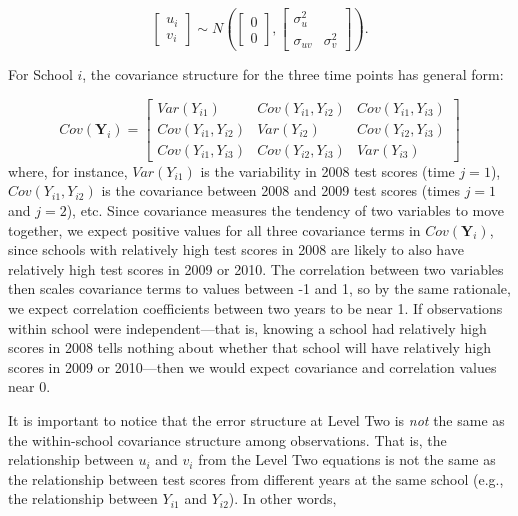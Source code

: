 \documentclass[
]{krantz}
\begin{document}
\[ \left[ \begin{array}{c}
            u_{i} \\ v_{i}
          \end{array}  \right] \sim N \left( \left[
          \begin{array}{c}
            0 \\ 0
          \end{array} \right], \left[
          \begin{array}{cc}
            \sigma_{u}^{2} & \\
            \sigma_{uv} & \sigma_{v}^{2}
          \end{array} \right] \right) . \]

For School \(i\), the covariance structure for the three time points has general form:

\[ Cov(\mathbf{Y}_i) =  \left[
          \begin{array}{cccc}
            Var(Y_{i1}) & Cov(Y_{i1},Y_{i2}) & Cov(Y_{i1},Y_{i3}) \\
            Cov(Y_{i1},Y_{i2}) & Var(Y_{i2}) & Cov(Y_{i2},Y_{i3}) \\
            Cov(Y_{i1},Y_{i3}) & Cov(Y_{i2},Y_{i3}) & Var(Y_{i3})
          \end{array} \right] \]
where, for instance, \(Var(Y_{i1})\) is the variability in 2008 test scores (time \(j=1\)), \(Cov(Y_{i1},Y_{i2})\) is the covariance between 2008 and 2009 test scores (times \(j=1\) and \(j=2\)), etc. Since covariance measures the tendency of two variables to move together, we expect positive values for all three covariance terms in \(Cov(\mathbf{Y}_i)\), since schools with relatively high test scores in 2008 are likely to also have relatively high test scores in 2009 or 2010. The correlation between two variables then scales covariance terms to values between -1 and 1, so by the same rationale, we expect correlation coefficients between two years to be near 1. If observations within school were independent---that is, knowing a school had relatively high scores in 2008 tells nothing about whether that school will have relatively high scores in 2009 or 2010---then we would expect covariance and correlation values near 0.

It is important to notice that the error structure at Level Two is \emph{not} the same as the within-school covariance structure among observations. That is, the relationship between \(u_{i}\) and \(v_{i}\) from the Level Two equations is not the same as the relationship between test scores from different years at the same school (e.g., the relationship between \(Y_{i1}\) and \(Y_{i2}\)). In other words,
\end{document}
